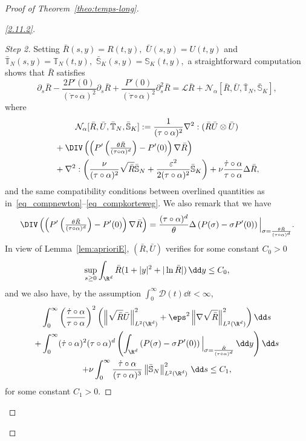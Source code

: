 \begin{proof}[Proof of Theorem~\ref{theo:temps-long}]
\begin{proof}[\eqref{2.11.2}]
\begin{proof}[Step 2]
Setting $\bar R(s,y)=R(t,y),$ $\bar U(s,y)=U(t,y)$ and $\bar{\mathbb T}_N(s,y) = \mathbb T_N(t,y),$ $\bar{\mathbb S}_K(s,y) = \mathbb S_K(t,y),$ a straightforward computation shows that $\bar R$ satisfies
\[
\partial_s \bar R - \frac{2P'(0)}{(\dot \tau \circ \alpha)^2}\partial_s \bar R + \frac{P'(0)}{(\dot \tau \circ \alpha)^2}\partial_s^2 \bar R = \mathcal L \bar R + \mathcal N_{\alpha} [\bar R, \bar U, \bar{\mathbb T}_N,\bar{\mathbb S}_K],
\]
where
\begin{multline}\label{eq:Nalpha}
\mathcal N_{\alpha} [\bar R, \bar U, \bar{\mathbb T}_N,\bar{\mathbb S}_K] := \frac{1}{ (\tau \circ \alpha)^2} \nabla^2 : (\bar R \bar U \otimes \bar U)\\
\begin{aligned}
&+ \DIV \left(\left(P'\left(\tfrac{\theta\bar R}{(\tau \circ \alpha)^d}\right) - P'(0)\right)\nabla \bar R \right) \\
&+ \nabla^2 : \left(\frac{\nu}{ (\tau \circ \alpha)^2} \sqrt{\bar{R}} \bar{\mathbb S}_N + \dfrac{\varepsilon^2}{2(\tau \circ \alpha)^2} \bar{\mathbb S}_K \right) +\nu \frac{\dot \tau \circ \alpha}{\tau \circ \alpha} \Delta \bar R,
\end{aligned}
\end{multline}
and the same compatibility conditions between overlined quantities as in~\eqref{eq_compnewton}--\eqref{eq_compkorteweg}. We also remark that we have
\[
\DIV \left(\left(P'\left(\tfrac{\theta\bar R}{(\tau \circ \alpha)^d}\right) - P'(0)\right) \nabla \bar R \right) = \dfrac{(\tau\circ \alpha)^d}{\theta} \Delta \left(P(\sigma) - \sigma P'(0)
\right)\Big|_{\sigma = \frac{\theta\bar R}{(\tau \circ \alpha)^d} }.
\]
In view of Lemma~\ref{lem:aprioriE}, $(\bar R, \bar U)$ verifies for some constant $C_0 >0$
\begin{equation}\label{eq:tilde-R-Linftyt}
\sup_{s \ge 0} \int_{\R^d} \bar R (1+|y|^2 + |\ln \bar R|) \, \dd y \le C_0,
\end{equation}
and we also have, by the assumption $\int_0^\infty \mathcal D(t)\dd t<\infty$,
\begin{multline}\label{eq:tilde-R-U-L2t}
\int_0^\infty \left(\frac{\dot \tau \circ \alpha}{\tau \circ \alpha}
\right)^2 \left(\left\|\sqrt{\bar R} \bar U \right\|_{L^2(\R^d)}^2 + \eps^2 \left\| \nabla \sqrt{\bar R} \right\|_{L^2(\R^d)}^2 \right) \dd s \\
+\int_0^\infty (\dot \tau\circ \alpha)^2 (\tau\circ \alpha)^{d}
\left(\int_{\R^d} \left(P(\sigma) - \sigma P'(0) \right)\Big|_{\sigma = \frac{\bar R}{(\tau \circ \alpha)^d} } \, \dd y \right) \dd s \\
+ \nu \int_0^\infty \frac{\dot \tau \circ \alpha}{(\tau \circ
\alpha)^3} \left\| \bar{\mathbb S}_N\right\|_{L^2(\R^d)}^2 \, \dd s
\le C_1,
\end{multline}
for some constant $C_1>0$.
\let\qed\relax
\end{proof}


\end{proof}
\end{proof}

